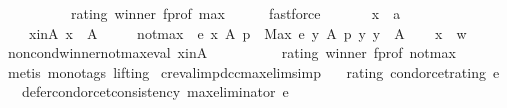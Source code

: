 \begin{isabellebody}
\ \ \ \ \ \ \ \ \ \ rating\ winner\ f{\isacharunderscore}{\kern0pt}prof\ max\isanewline
\ \ \ \ \isamarkupfalse%
\ fastforce\isanewline
{}\isamarkupfalse%
\isanewline
\ \ \isamarkupfalse%
\isanewline
\ \ \ \ x\ {\isacharcolon}{\kern0pt}{\isacharcolon}{\kern0pt}\ {\isachardoublequoteopen}{\isacharprime}{\kern0pt}a{\isachardoublequoteclose}\isanewline
\ \ \isamarkupfalse%
\isanewline
\ \ \ \ x{\isacharunderscore}{\kern0pt}in{\isacharunderscore}{\kern0pt}A{\isacharcolon}{\kern0pt}\ {\isachardoublequoteopen}x\ {\isasymin}\ A{\isachardoublequoteclose}\ \isanewline
\ \ \ \ not{\isacharunderscore}{\kern0pt}max{\isacharcolon}{\kern0pt}\ {\isachardoublequoteopen}{\isasymnot}\ e\ x\ A\ p\ {\isacharless}{\kern0pt}\ Max\ {\isacharbraceleft}{\kern0pt}e\ y\ A\ p\ {\isacharbar}{\kern0pt}y{\isachardot}{\kern0pt}\ y\ {\isasymin}\ A{\isacharbraceright}{\kern0pt}{\isachardoublequoteclose}\isanewline
\ \ \isamarkupfalse%
\ {\isachardoublequoteopen}x\ {\isacharequal}{\kern0pt}\ w{\isachardoublequoteclose}\isanewline
\ \ \ \ \isamarkupfalse%
\ non{\isacharunderscore}{\kern0pt}cond{\isacharunderscore}{\kern0pt}winner{\isacharunderscore}{\kern0pt}not{\isacharunderscore}{\kern0pt}max{\isacharunderscore}{\kern0pt}eval\ x{\isacharunderscore}{\kern0pt}in{\isacharunderscore}{\kern0pt}A\isanewline
\ \ \ \ \ \ \ \ \ \ rating\ winner\ f{\isacharunderscore}{\kern0pt}prof\ not{\isacharunderscore}{\kern0pt}max\isanewline
\ \ \ \ \isamarkupfalse%
\ {\isacharparenleft}{\kern0pt}metis\ {\isacharparenleft}{\kern0pt}mono{\isacharunderscore}{\kern0pt}tags{\isacharcomma}{\kern0pt}\ lifting{\isacharparenright}{\kern0pt}{\isacharparenright}{\kern0pt}\isanewline
{}\isamarkupfalse%
%
\endisatagproof
{\isafoldproof}%
%
\isadelimproof
\isanewline
%
\endisadelimproof
\isanewline
\isanewline
{}\isamarkupfalse%
\ cr{\isacharunderscore}{\kern0pt}eval{\isacharunderscore}{\kern0pt}imp{\isacharunderscore}{\kern0pt}dcc{\isacharunderscore}{\kern0pt}max{\isacharunderscore}{\kern0pt}elim{\isacharbrackleft}{\kern0pt}simp{\isacharbrackright}{\kern0pt}{\isacharcolon}{\kern0pt}\isanewline
\ \ \ rating{\isacharcolon}{\kern0pt}\ {\isachardoublequoteopen}condorcet{\isacharunderscore}{\kern0pt}rating\ e{\isachardoublequoteclose}\isanewline
\ \ \ {\isachardoublequoteopen}defer{\isacharunderscore}{\kern0pt}condorcet{\isacharunderscore}{\kern0pt}consistency\ {\isacharparenleft}{\kern0pt}max{\isacharunderscore}{\kern0pt}eliminator\ e{\isacharparenright}{\kern0pt}{\isachardoublequoteclose}\isanewline

\end{isabellebody}
